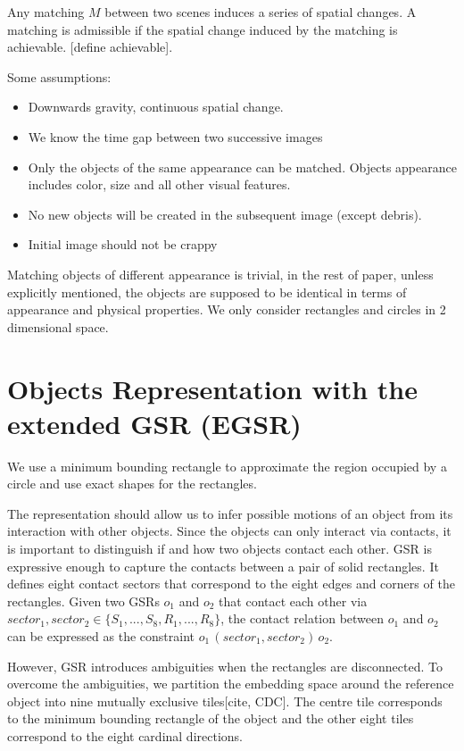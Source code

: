 \documentclass[letterpaper]{article}
\begin{document}
Any matching $M$ between two scenes induces a series of spatial changes. A matching is admissible if the spatial change induced by the matching is achievable. [define achievable]. 

Some assumptions:
\begin{itemize}
\item Downwards gravity, continuous spatial change.
\item We know the time gap between two successive images
\item Only the objects of the same appearance can be matched. Objects appearance includes color, size and all other visual features. 
\item No new objects will be created in the subsequent image (except debris).
\item Initial image should not be crappy
\end{itemize}

Matching objects of different appearance is trivial, in the rest of paper, unless explicitly mentioned, the objects are supposed to be identical in terms of appearance and physical properties. We only consider rectangles and circles in 2 dimensional space. 

\section{Objects Representation with the extended GSR (EGSR)}

We use a minimum bounding rectangle to approximate the region occupied by a circle and use exact shapes for the rectangles.

The representation should allow us to infer possible motions of an object from its interaction with other objects. Since the objects can only interact via contacts, it is important to distinguish if and how two objects contact each other.  GSR is expressive enough to capture the contacts between a pair of solid rectangles. It defines eight contact sectors that correspond to the eight edges and corners of the rectangles. Given two GSRs $o_1$ and $o_2$ that contact each other via $sector_1, sector_2 \in \{S_1, ..., S_8, R_1, ..., R_8\}$, the contact relation between $o_1$ and $o_2$ can be expressed as the constraint $o_1 \, (sector_1, sector_2) \, o_2$. 

However, GSR introduces ambiguities when the rectangles are disconnected. To overcome the ambiguities, we partition the embedding space around the reference object into nine mutually exclusive tiles[cite, CDC]. The centre tile corresponds to the minimum bounding rectangle of the object and the other eight tiles correspond to the eight cardinal directions. 
\end{document}
